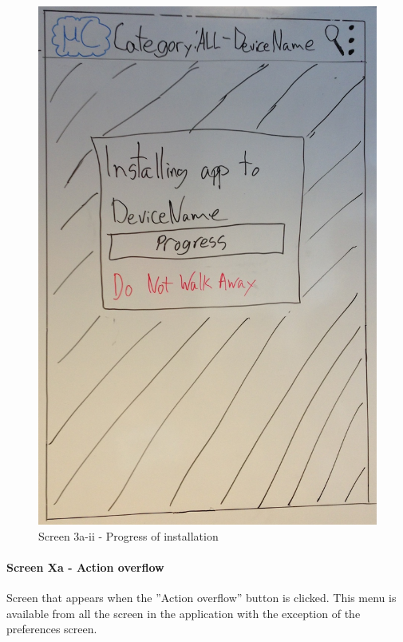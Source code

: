 \begin{figure}[H]
\centering
\includegraphics[scale=0.2]{images/Design_guide/Screen3a-ii.png}
\caption{Screen 3a-ii - Progress of installation}
\end{figure}


\paragraph{Screen Xa - Action overflow}
Screen that appears when the ''Action overflow'' button is clicked. This menu is available from all the screen in the application with the exception of the preferences screen.

